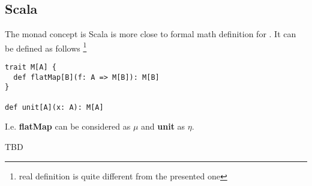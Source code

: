 \subsection{Scala}

\begin{example}
The monad concept is Scala is more close to formal math definition for
. It can be defined as follows 
\footnote{real definition is quite different from the presented one}
\label{ex:monad_scala}
\begin{verbatim}
trait M[A] {
  def flatMap[B](f: A => M[B]): M[B]
}
  
def unit[A](x: A): M[A]
\end{verbatim} 
I.e. \textbf{flatMap} can be considered as $\mu$ and
\textbf{unit} as $\eta$. 
\end{example}

TBD

